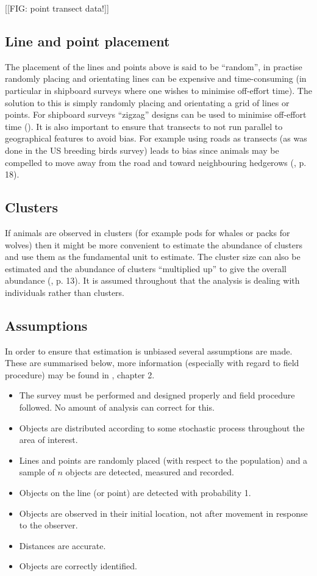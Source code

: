 [[FIG: point transect data!]]


\subsection{Line and point placement}
The placement of the lines and points above is said to be ``random'', in practise randomly placing and orientating lines can be expensive and time-consuming (in particular in shipboard surveys where one wishes to minimise off-effort time). The solution to this is simply randomly placing and orientating a grid of lines or points. For shipboard surveys ``zigzag'' designs can be used to minimise off-effort time (\cite{strindberg04}). It is also important to ensure that transects to not run parallel to geographical features to avoid bias. For example using roads as transects (as was done in the US breeding birds survey) leads to bias since animals may be compelled to move away from the road and toward neighbouring hedgerows (\cite{IDS}, p. 18).

\subsection{Clusters}
If animals are observed in clusters (for example pods for whales or packs for wolves) then it might be more convenient to estimate the abundance of clusters and use them as the fundamental unit to estimate. The cluster size can also be estimated and the abundance of clusters ``multiplied up'' to give the overall abundance (\cite{IDS}, p. 13). It is assumed throughout that the analysis is dealing with individuals rather than clusters.

\subsection{Assumptions}
In order to ensure that estimation is unbiased several assumptions are made. These are summarised below, more information (especially with regard to field procedure) may be found in \cite{IDS}, chapter 2.

\begin{itemize}
	\item The survey must be performed and designed properly and field procedure followed. No amount of analysis can correct for this.
	\item Objects are distributed according to some stochastic process throughout the area of interest.
	\item Lines and points are randomly placed (with respect to the population) and a sample of $n$ objects are detected, measured and recorded.
	\item Objects on the line (or point) are detected with probability 1.
	\item Objects are observed in their initial location, not after movement in response to the observer.
	\item Distances are accurate.
	\item Objects are correctly identified.
\end{itemize}

